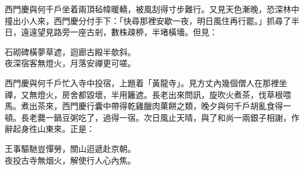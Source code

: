 西門慶與何千戶坐着兩頂毡幃暖轎，被風刮得寸步難行。又見天色漸晚，恐深林中撞出小人來，西門慶分付手下：「快尋那裡安歇一夜，明日風住再行罷。」抓尋了半日，遠遠望見路旁一座古剎，數株疎桺，半堵橫墻。但見：

\begin{myquote}
石砌碑橫夢草遮，迴廊古殿半欹斜。\\夜深宿客無燈火，月落安禪更可嗟。
\end{myquote}

西門慶與何千戶忙入寺中投宿，上題着「黃龍寺」。見方丈內幾個僧人在那裡坐禪，又無燈火，房舍都毀壞，半用籬遮。{}長老出來問訊，旋吹火煮茶，伐草根喂馬。煮出茶來，西門慶行囊中帶得乾雞臘肉菓餅之類，晚夕與何千戶胡亂食得一頓。長老爨一鍋豆粥吃了，過得一宿。次日風止天晴，與了和尚一兩銀子相謝，作辭起身徃山東來。正是：

\begin{myquote}
王事驅馳豈憚勞，關山迢遞赴京朝。\\夜投古寺無烟火，解使行人心內焦。
\end{myquote}

